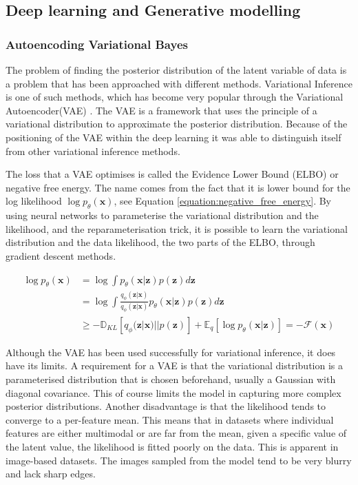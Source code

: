 \documentclass{article}
\newcommand{\bx}{\mathbf{x}}
\newcommand{\bz}{\mathbf{z}}
\begin{document}
\subsection{Deep learning and Generative modelling}

\subsubsection*{Autoencoding Variational Bayes}
The problem of finding the posterior distribution of the latent variable of data is a problem that has been approached with different methods. Variational Inference is one of such methods, which has become very popular through the Variational Autoencoder(VAE) \cite{kingma2013auto}. The VAE is a framework that uses the principle of a variational distribution to approximate the posterior distribution. Because of the positioning of the VAE within the deep learning it was able to distinguish itself from other variational inference methods. 

The loss that a VAE optimises is called the Evidence Lower Bound (ELBO) or negative free energy. The name comes from the  fact that it is lower bound for the log likelihood $\log p_\theta(\bx)$, see Equation \ref{equation:negative_free_energy}. By using neural networks to parameterise the variational distribution and the likelihood, and the reparameterisation trick, it is possible to learn the variational distribution and the data likelihood, the two parts of the ELBO, through gradient descent methods.

\begin{equation}\label{equation:negative_free_energy}
    \begin{split}
    \log p_\theta(\bx) &= \log \int p_\theta(\bx | \bz) p(\bz) d\bz\\
    &= \log \int \frac{q_\phi(\bz|\bx)}{q_\phi(\bz|\bx)} p_\theta(\bx | \bz) p(\bz) d\bz\\
    &\geq -\mathbb{D}_{KL}[q_\phi(\bz|\bx) || p(\bz)] + \mathbb{E}_q[\log p_\theta(\bx|\bz)] = -\mathcal{F}(\bx)
    \end{split}    
\end{equation}
    

Although the VAE has been used successfully for variational inference, it does have its limits. A requirement for a VAE is that the variational distribution is a parameterised distribution that is chosen beforehand, usually a Gaussian with diagonal covariance. This of course limits the model in capturing more complex posterior distributions. Another disadvantage is that the likelihood tends to converge to a per-feature mean. This means that in datasets where individual features are either multimodal or are far from the mean, given a specific value of the latent value, the likelihood is fitted poorly on the data. This is apparent in image-based datasets. The images sampled from the model tend to be very blurry and lack sharp edges.
\end{document}
